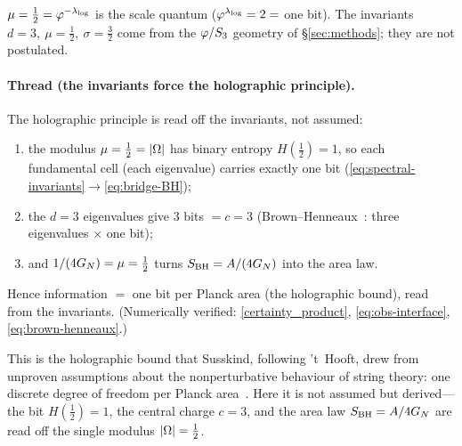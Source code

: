 \begin{remark}
$\mu=\tfrac12=\varphi^{-\lambda_{\log}}$ is the scale quantum ($\varphi^{\lambda_{\log}}=2=$ one bit). The invariants
$d=3,\ \mu=\tfrac12,\ \sigma=\tfrac32$ come from the $\varphi/S_{3}$ geometry of
\S\ref{sec:methods}; they are not postulated.
\end{remark}

\paragraph{Thread (the invariants force the holographic principle).}
The holographic principle is read off the invariants, not assumed:
\begin{enumerate}
  \item the modulus $\mu=\tfrac12=|\Omega|$ has binary entropy $H(\tfrac12)=1$, so each fundamental
        cell (each eigenvalue) carries exactly one bit
        (\eqref{eq:spectral-invariants}$\to$\eqref{eq:bridge-BH});
  \item the $d=3$ eigenvalues give $3$ bits $=c=3$ (Brown--Henneaux~\cite{BrownHenneaux86}: three eigenvalues $\times$
        one bit);
  \item and $1/(4G_{N})=\mu=\tfrac12$ turns $S_{\mathrm{BH}}=A/(4G_{N})$ into the area law.
\end{enumerate}
Hence information $=$ one bit per Planck area (the holographic bound), read from the invariants.
(Numerically verified: \eqref{certainty_product}, \eqref{eq:obs-interface}, \eqref{eq:brown-henneaux}.)

This is the holographic bound that Susskind, following 't~Hooft, drew from unproven
assumptions about the nonperturbative behaviour of string theory: one discrete degree of
freedom per Planck area~\cite{Susskind95,SusskindWitten98}. Here it is not assumed but
derived---the bit $H(\tfrac12)=1$, the central charge $c=3$, and the area law
$S_{\mathrm{BH}}=A/4G_{N}$ are read off the single modulus $|\Omega|=\tfrac12$.


